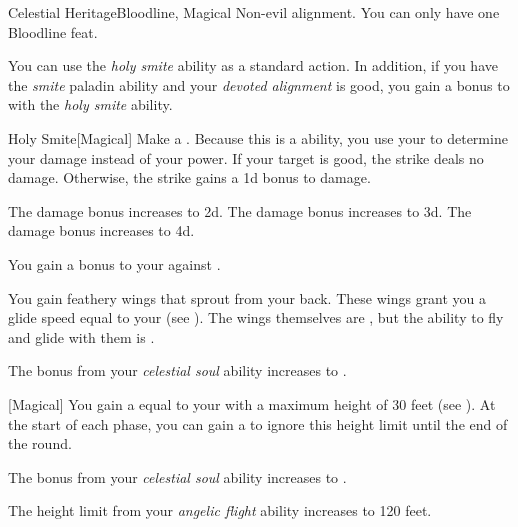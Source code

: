     \begin{feat}{Celestial Heritage}{Bloodline, Magical}
        \featpre Non-evil alignment.
         You can only have one Bloodline feat.

         You can use the \textit{holy smite} ability as a standard action.
        In addition, if you have the \textit{smite} paladin ability and your \textit{devoted alignment} is good, you gain a  bonus to  with the \textit{holy smite} ability.
        \begin{freeability}{Holy Smite}[Magical]
            Make a .
            Because this is a  ability, you use your   to determine your damage instead of your  power.
            If your target is good, the strike deals no damage.
            Otherwise, the strike gains a \plus1d bonus to damage.

            \rankline
             The damage bonus increases to \plus2d.
             The damage bonus increases to \plus3d.
             The damage bonus increases to \plus4d.
        \end{freeability}

         You gain a  bonus to your  against .

         You gain feathery wings that sprout from your back.
        These wings grant you a glide speed equal to your  (see ).
        The wings themselves are , but the ability to fly and glide with them is .

         The bonus from your \textit{celestial soul} ability increases to .

        [Magical] You gain a  equal to your  with a maximum height of 30 feet (see ).
        At the start of each phase, you can gain a  to ignore this height limit until the end of the round.

         The bonus from your \textit{celestial soul} ability increases to .

         The height limit from your \textit{angelic flight} ability increases to 120 feet.
    \end{feat}

